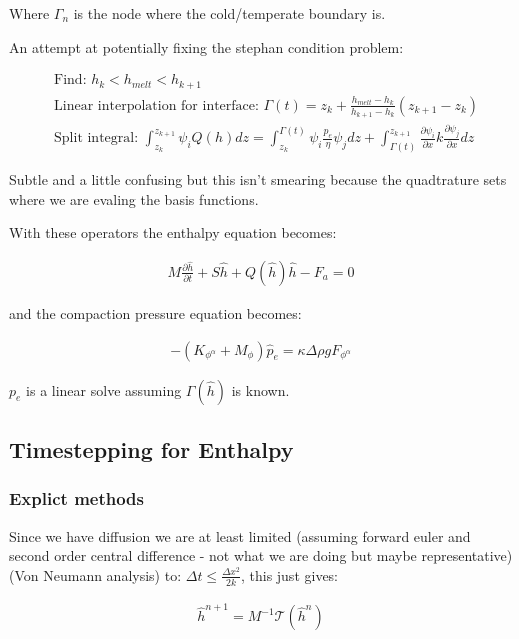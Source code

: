 \documentclass[a4paper,12pt]{article}
\newcommand{\pd}[2]{\frac{\partial #1}{\partial #2}}
\begin{document}
Where $\Gamma_n$ is the node where the cold/temperate boundary is.

\vspace{3mm}

An attempt at potentially fixing the stephan condition problem:

\begin{align*}
  &\text{Find: } h_k < h_{melt} < h_{k+1}\\
  &\text{Linear interpolation for interface: } \Gamma(t) = z_k + \frac{h_{melt} - h_k}{h_{k+1} - h_{k}}(z_{k+1} - z_k)\\
  &\text{Split integral: } \int_{z_k}^{z_{k+1}}\psi_i Q(h)dz = \int_{z_k}^{\Gamma(t)}\psi_i \frac{p_e}{\eta}\psi_jdz + \int_{\Gamma(t)}^{z_{k+1}}\pd{\psi_i}{x}k\pd{\psi_j}{x}dz
\end{align*}

Subtle and a little confusing but this isn't smearing because the quadtrature sets where we are evaling the basis functions.

With these operators the enthalpy equation becomes:

\begin{align*}
  M\pd{\hat{h}}{t} + S\hat{h} + Q(\hat{h})\hat{h} - F_a = 0
\end{align*}

and the compaction pressure equation becomes:

\begin{align*}
  -(K_{\phi^\alpha} + M_\phi)\hat{p}_e = \kappa\Delta\rho g F_{\phi^\alpha}
\end{align*}

$p_e$ is a linear solve assuming $\Gamma(\hat{h})$ is known.

\subsection{Timestepping for Enthalpy}

\subsubsection{Explict methods}

Since we have diffusion we are at least limited (assuming forward euler and second order central difference - not what we are doing but maybe representative) (Von Neumann analysis) to: $\Delta  t \leq \frac{\Delta x^2}{2k}$, this just gives:

\begin{align*}
  \hat{h}^{n+1} = M^{-1}\mathcal{T}(\hat{h}^n)
\end{align*}
\end{document}

